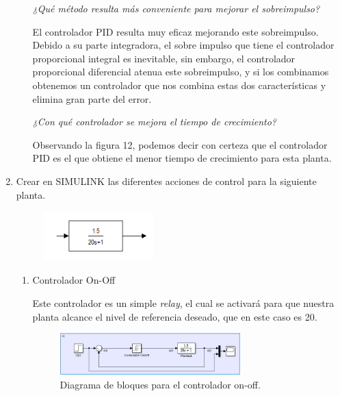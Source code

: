 \documentclass[12pt, letterpaper]{article}
\begin{document}
\begin{enumerate}
\begin{enumerate}
				\textit{¿Qué método resulta más conveniente para mejorar el sobreimpulso?}

				El controlador PID resulta muy eficaz mejorando este sobreimpulso. Debido a su parte integradora, el sobre impulso que tiene el controlador proporcional integral es inevitable, sin embargo, el controlador proporcional diferencial atenua este sobreimpulso, y si los combinamos obtenemos un controlador que nos combina estas dos características y elimina gran parte del error.

				\textit{¿Con qué controlador se mejora el tiempo de crecimiento?}

				Observando la figura 12, podemos decir con certeza que el controlador PID es el que obtiene el menor tiempo de crecimiento para esta planta.

		\end{enumerate}

	\item Crear en SIMULINK las diferentes acciones de control para la siguiente planta.

				\begin{figure}[H]
					\centering
					\includegraphics[width=0.4\textwidth]{planta2.png}
				\end{figure}
				\begin{enumerate}
					\item Controlador On-Off

						Este controlador es un simple \textit{relay}, el cual se activará para que nuestra planta alcance el nivel de referencia deseado, que en este caso es 20.

				\begin{figure}[H]
					\centering
					\includegraphics[width=0.7\textwidth]{2a.png}
					\caption{Diagrama de bloques para el controlador on-off.}
				\end{figure}


\end{enumerate}
\end{enumerate}
\end{document}
